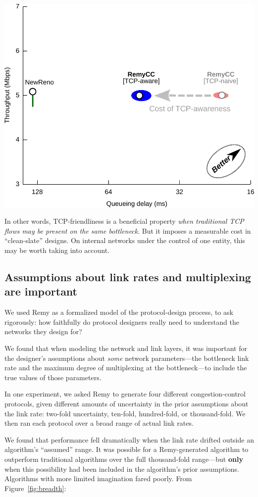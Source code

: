 \begin{center}
\includegraphics[width=0.75 \textwidth]{homo-3.pdf}
\end{center}

In other words, TCP-friendliness is a beneficial property \emph{when
  traditional TCP flows may be present on the same bottleneck}. But it
imposes a measurable cost in ``clean-slate'' designs. On internal networks
under the control of one entity, this may be worth taking into account.

\subsection{Assumptions about link rates and multiplexing are important}

We used Remy as a formalized model of the protocol-design process, to
ask rigorously: how faithfully do protocol designers really need to
understand the networks they design for?

We found that when modeling the network and link layers, it was
important for the designer's assumptions about \emph{some} network
parameters---the bottleneck link rate and the maximum degree of
multiplexing at the bottleneck---to include the true values of those
parameters.

In one experiment, we asked Remy to generate four different
congestion-control protocols, given different amounts of uncertainty
in the prior assumptions about the link rate: two-fold uncertainty,
ten-fold, hundred-fold, or thousand-fold. We then ran each protocol over a
broad range of actual link rates.

We found that performance fell dramatically when the link rate drifted
outside an algorithm's ``assumed'' range. It was possible for a
Remy-generated algorithm to outperform traditional algorithms over the
full thousand-fold range---but \textbf{only} when this possibility had
been included in the algorithm's prior assumptions. Algorithms with
more limited imagination fared poorly. From Figure~\ref{fig:breadth}:

